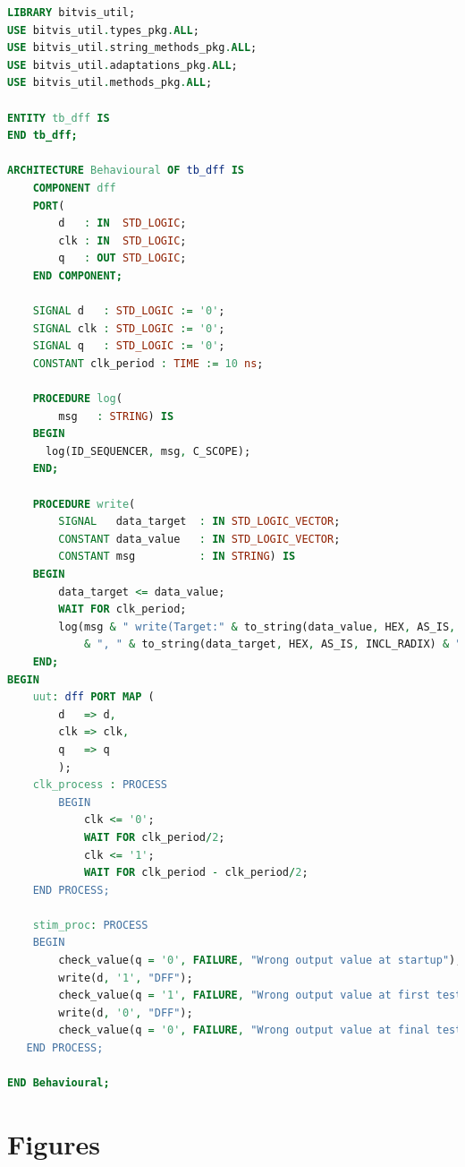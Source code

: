 \documentclass[11pt,british]{article}
\begin{document}
\begin{appendices}
\begin{lstlisting}[language=VHDL, tabsize=4, frame=single, framesep=2mm, belowskip=4pt, aboveskip=4pt, showstringspaces=false, basicstyle=\scriptsize]
LIBRARY bitvis_util;
USE bitvis_util.types_pkg.ALL;
USE bitvis_util.string_methods_pkg.ALL;
USE bitvis_util.adaptations_pkg.ALL;
USE bitvis_util.methods_pkg.ALL;

ENTITY tb_dff IS
END tb_dff;

ARCHITECTURE Behavioural OF tb_dff IS
	COMPONENT dff
    PORT(
		d 	: IN  STD_LOGIC;
        clk : IN  STD_LOGIC;
		q 	: OUT STD_LOGIC;
    END COMPONENT;
    
	SIGNAL d   : STD_LOGIC := '0';
	SIGNAL clk : STD_LOGIC := '0';
	SIGNAL q   : STD_LOGIC := '0';
	CONSTANT clk_period : TIME := 10 ns;
	
	PROCEDURE log(
    	msg   : STRING) IS
    BEGIN
      log(ID_SEQUENCER, msg, C_SCOPE);
    END;
    
	PROCEDURE write(
    	SIGNAL   data_target  : IN STD_LOGIC_VECTOR;
    	CONSTANT data_value   : IN STD_LOGIC_VECTOR;
    	CONSTANT msg          : IN STRING) IS
    BEGIN
    	data_target <= data_value;
    	WAIT FOR clk_period;
    	log(msg & " write(Target:" & to_string(data_value, HEX, AS_IS, INCL_RADIX) 
    		& ", " & to_string(data_target, HEX, AS_IS, INCL_RADIX) & ")";);
    END;
BEGIN
	uut: dff PORT MAP (
        d 	=> d,
        clk => clk,
		q 	=> q
        );
	clk_process : PROCESS
		BEGIN
			clk <= '0';
			WAIT FOR clk_period/2;
			clk <= '1';
			WAIT FOR clk_period - clk_period/2;
	END PROCESS;
	
	stim_proc: PROCESS
	BEGIN		
		check_value(q = '0', FAILURE, "Wrong output value at startup");
		write(d, '1', "DFF");
		check_value(q = '1', FAILURE, "Wrong output value at first test");
		write(d, '0', "DFF");
		check_value(q = '0', FAILURE, "Wrong output value at final test");
   END PROCESS;
   
END Behavioural;
\end{lstlisting}

\newpage{}
\section{Figures}

\end{appendices}
\end{document}
